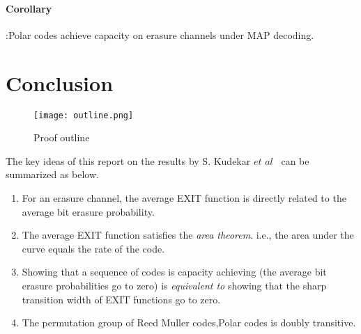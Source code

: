 \documentclass[
10pt, %
a4paper, %
oneside, %
headinclude,footinclude, %
BCOR5mm, %
]{scrartcl}
\begin{document}
\paragraph*{Corollary}:Polar codes achieve capacity on erasure channels under MAP decoding.


\section{Conclusion}
\begin{figure}[h]
\centering
\texttt{[image: outline.png]}
\caption[]{Proof outline}
\end{figure}
\par The key ideas of this report on the results by S. Kudekar $et$ $al$~\cite{rm1} can be summarized as below.
\begin{enumerate}
\item For an erasure channel, the average EXIT function is directly related to the average bit erasure probability.
\item The average EXIT function satisfies the \emph{area theorem}. i.e., the area under the curve equals the rate of the code.
\item Showing that a sequence of codes is capacity achieving (the average bit erasure probabilities go to zero) is \emph{equivalent to} showing that the sharp transition width of EXIT functions go to zero.
\item The permutation group of Reed Muller codes,Polar codes is doubly transitive.
\end{enumerate}



\end{document}
